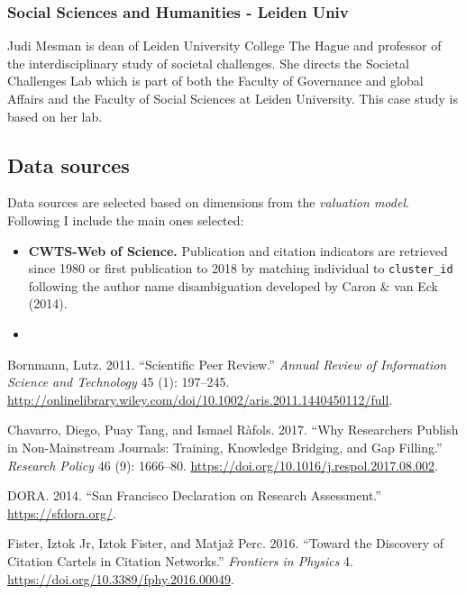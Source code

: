 \documentclass[]{elsarticle} %
\begin{document}
\hypertarget{social-sciences-and-humanities---leiden-univ}{%
\subsubsection{Social Sciences and Humanities - Leiden
Univ}\label{social-sciences-and-humanities---leiden-univ}}

Judi Mesman is dean of Leiden University College The Hague and professor
of the interdisciplinary study of societal challenges. She directs the
Societal Challenges Lab which is part of both the Faculty of Governance
and global Affairs and the Faculty of Social Sciences at Leiden
University. This case study is based on her lab.

\hypertarget{data-sources}{%
\subsection{Data sources}\label{data-sources}}

Data sources are selected based on dimensions from the \emph{valuation
model}. Following I include the main ones selected:

\begin{itemize}
\item
  \textbf{CWTS-Web of Science.} Publication and citation indicators are
  retrieved since 1980 or first publication to 2018 by matching
  individual to \texttt{cluster\_id} following the author name
  disambiguation developed by Caron \& van Eck (2014).
\item
\end{itemize}

\hypertarget{refs}{}
\leavevmode\hypertarget{ref-bornmannScientificPeerReview2011}{}%
Bornmann, Lutz. 2011. ``Scientific Peer Review.'' \emph{Annual Review of
Information Science and Technology} 45 (1): 197--245.
\url{http://onlinelibrary.wiley.com/doi/10.1002/aris.2011.1440450112/full}.

\leavevmode\hypertarget{ref-chavarroWhyResearchersPublish2017}{}%
Chavarro, Diego, Puay Tang, and Ismael Ràfols. 2017. ``Why Researchers
Publish in Non-Mainstream Journals: Training, Knowledge Bridging, and
Gap Filling.'' \emph{Research Policy} 46 (9): 1666--80.
\url{https://doi.org/10.1016/j.respol.2017.08.002}.

\leavevmode\hypertarget{ref-doraSanFranciscoDeclaration2014}{}%
DORA. 2014. ``San Francisco Declaration on Research Assessment.''
\url{https://sfdora.org/}.

\leavevmode\hypertarget{ref-fisterDiscoveryCitationCartels2016}{}%
Fister, Iztok Jr, Iztok Fister, and Matjaž Perc. 2016. ``Toward the
Discovery of Citation Cartels in Citation Networks.'' \emph{Frontiers in
Physics} 4. \url{https://doi.org/10.3389/fphy.2016.00049}.
\end{document}
